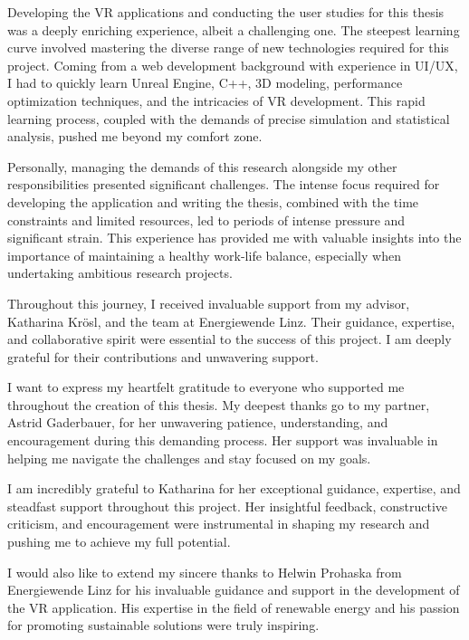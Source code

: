 \documentclass[draft, final]{vutinfth} %
\begin{document}
\frontmatter %

\addstatementpage

\begin{acknowledgements*}
Developing the VR applications and conducting the user studies for this thesis was a deeply enriching experience, albeit a challenging one. The steepest learning curve involved mastering the diverse range of new technologies required for this project. Coming from a web development background with experience in UI/UX, I had to quickly learn Unreal Engine, C++, 3D modeling, performance optimization techniques, and the intricacies of VR development. This rapid learning process, coupled with the demands of precise simulation and statistical analysis, pushed me beyond my comfort zone.

Personally, managing the demands of this research alongside my other responsibilities presented significant challenges. The intense focus required for developing the application and writing the thesis, combined with the time constraints and limited resources, led to periods of intense pressure and significant strain. This experience has provided me with valuable insights into the importance of maintaining a healthy work-life balance, especially when undertaking ambitious research projects.

Throughout this journey, I received invaluable support from my advisor, Katharina Krösl, and the team at Energiewende Linz. Their guidance, expertise, and collaborative spirit were essential to the success of this project. I am deeply grateful for their contributions and unwavering support. 

I want to express my heartfelt gratitude to everyone who supported me throughout the creation of this thesis. My deepest thanks go to my partner, Astrid Gaderbauer, for her unwavering patience, understanding, and encouragement during this demanding process. Her support was invaluable in helping me navigate the challenges and stay focused on my goals.

I am incredibly grateful to Katharina for her exceptional guidance, expertise, and steadfast support throughout this project. Her insightful feedback, constructive criticism, and encouragement were instrumental in shaping my research and pushing me to achieve my full potential.

I would also like to extend my sincere thanks to Helwin Prohaska from Energiewende Linz for his invaluable guidance and support in the development of the VR application. His expertise in the field of renewable energy and his passion for promoting sustainable solutions were truly inspiring.


\end{acknowledgements*}
\end{document}
